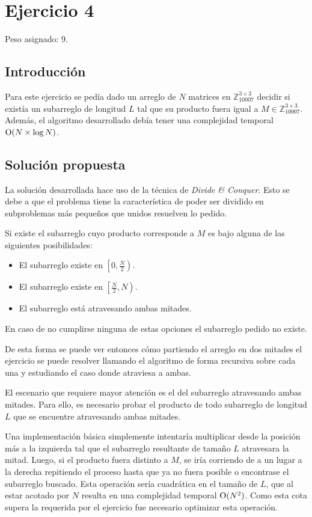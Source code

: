 \section{Ejercicio 4}

Peso asignado: 9.

\subsection{Introducción}

Para este ejercicio se pedía dado un arreglo de $N$ matrices en
$\mathbb{Z}_{10007}^{3 \times 3}$ decidir si existía un subarreglo de longitud
$L$ tal que su producto fuera igual a $M \in \mathbb{Z}_{10007}^{3 \times 3}$.
Además, el algoritmo desarrollado debía tener una complejidad temporal $\operatorname{O}(N
\times \log N)$.

\subsection{Solución propuesta}\label{ej4:sol}

La solución desarrollada hace uso de la técnica de \emph{Divide \& Conquer}.
Esto se debe a que el problema tiene la característica de poder ser dividido en
subproblemas más pequeños que unidos resuelven lo pedido.

Si existe el subarreglo cuyo producto corresponde a $M$ es bajo alguna de
las siguientes posibilidades:

\begin{itemize}
	\item El subarreglo existe en $\left[ 0,\frac{N}{2} \right)$.
	\item El subarreglo existe en $\left[\frac{N}{2}, N \right)$.
	\item El subarreglo está atravesando ambas mitades.
\end{itemize}

En caso de no cumplirse ninguna de estas opciones el subarreglo pedido no
existe.

De esta forma se puede ver entonces cómo partiendo el arreglo en dos
mitades el ejercicio se puede resolver llamando el algoritmo de forma recursiva
sobre cada una y estudiando el caso donde atraviesa a ambas.

El escenario que requiere mayor atención es el del subarreglo atravesando ambas mitades.
Para ello, es necesario probar el producto de todo subarreglo de longitud $L$
que se encuentre atravesando ambas mitades.

Una implementación básica simplemente intentaría multiplicar desde la posición
más a la izquierda tal que el subarreglo resultante de tamaño $L$ atravesara la
mitad. Luego, si el producto fuera distinto a $M$, se iría corriendo de a un
lugar a la derecha repitiendo el proceso hasta que ya no fuera posible o
encontrase el subarreglo buscado. Esta operación sería cuadrática en el tamaño
de $L$, que al estar acotado por $N$ resulta en una complejidad temporal
$\operatorname{O}(N^{2})$. Como esta cota supera la requerida por el ejercicio fue necesario
optimizar esta operación.

